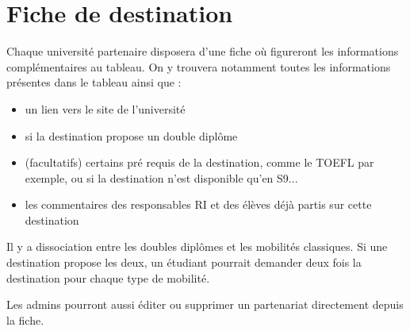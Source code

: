  \section{Fiche de destination}
 Chaque université partenaire disposera d'une fiche où figureront les informations complémentaires au tableau.
 On y trouvera notamment toutes les informations présentes dans le tableau ainsi que :
 \begin{itemize}
 	\item un lien vers le site de l'université
 	\item si la destination propose un double diplôme
 	\item (facultatifs) certains pré requis de la destination, comme le TOEFL par exemple, ou si la destination n'est disponible qu'en S9...
 	\item les commentaires des responsables RI et des élèves déjà partis sur cette destination
 \end{itemize}
 
 Il y a dissociation entre les doubles diplômes et les mobilités classiques. Si une destination propose les deux, un étudiant pourrait demander deux fois la destination pour chaque type de mobilité.
 
 Les admins pourront aussi éditer ou supprimer un partenariat directement depuis la fiche.